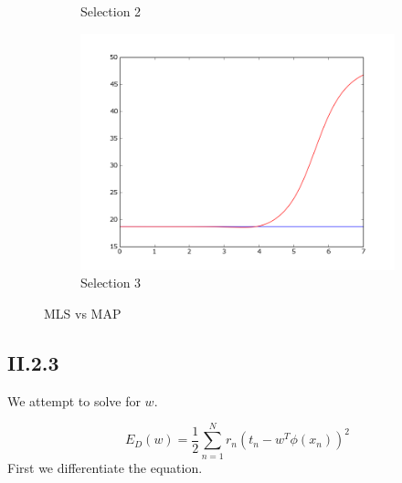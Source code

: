 \documentclass{article}
\begin{document}
\begin{figure}[!ht]
\begin{subfigure}[b]{0.4\textwidth}
        \caption{Selection 2}
        \label{fig:II222}
    \end{subfigure}
    \begin{subfigure}[b]{0.4\textwidth}
        \includegraphics[width=\textwidth]{Part2/II223.png}
        \caption{Selection 3}
        \label{fig:II223}
    \end{subfigure}
    \caption{MLS vs MAP}
    \label{fig:II22}
\end{figure}




\subsection{II.2.3}

We attempt to solve for $w$.

\begin{equation*}
    E_{D}(w) = \frac{1}{2} \sum_{n=1}^{N} r_n(t_n - w^T\phi(x_n))^2
\end{equation*}
First we differentiate the equation.
\end{document}
